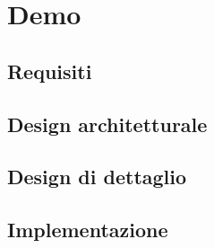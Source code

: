 \chapter{Demo}\label{ch:demo}

\section{Requisiti}\label{sec:demo-requisiti}

\section{Design architetturale}\label{sec:demo-design-architetturale}

\section{Design di dettaglio}\label{sec:demo-design-di-dettaglio}

\section{Implementazione}\label{sec:demo-implementazione}